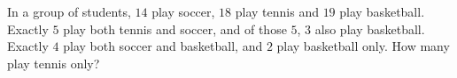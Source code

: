 In a group of students, $14$ play soccer, $18$ play tennis and $19$ play basketball. Exactly $5$ play both tennis and soccer, and of those $5$, $3$ also play basketball. Exactly $4$ play both soccer and basketball, and $2$ play basketball only. How many play tennis only?
